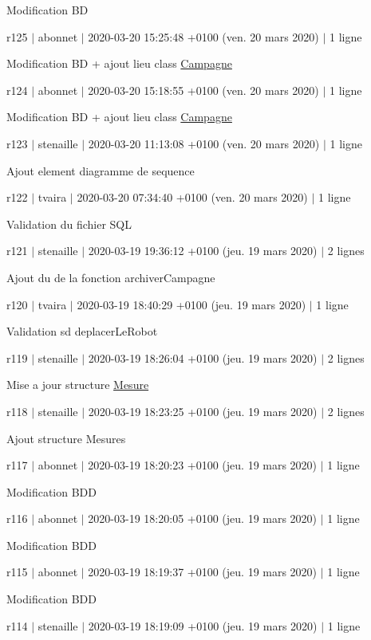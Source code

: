 Modification BD

r125 $\vert$ abonnet $\vert$ 2020-\/03-\/20 15\+:25\+:48 +0100 (ven. 20 mars 2020) $\vert$ 1 ligne

Modification BD + ajout lieu class \hyperlink{class_campagne}{Campagne}

r124 $\vert$ abonnet $\vert$ 2020-\/03-\/20 15\+:18\+:55 +0100 (ven. 20 mars 2020) $\vert$ 1 ligne

Modification BD + ajout lieu class \hyperlink{class_campagne}{Campagne}

r123 $\vert$ stenaille $\vert$ 2020-\/03-\/20 11\+:13\+:08 +0100 (ven. 20 mars 2020) $\vert$ 1 ligne

Ajout element diagramme de sequence

r122 $\vert$ tvaira $\vert$ 2020-\/03-\/20 07\+:34\+:40 +0100 (ven. 20 mars 2020) $\vert$ 1 ligne

Validation du fichier S\+QL

r121 $\vert$ stenaille $\vert$ 2020-\/03-\/19 19\+:36\+:12 +0100 (jeu. 19 mars 2020) $\vert$ 2 lignes

Ajout du de la fonction archiver\+Campagne

r120 $\vert$ tvaira $\vert$ 2020-\/03-\/19 18\+:40\+:29 +0100 (jeu. 19 mars 2020) $\vert$ 1 ligne

Validation sd deplacer\+Le\+Robot

r119 $\vert$ stenaille $\vert$ 2020-\/03-\/19 18\+:26\+:04 +0100 (jeu. 19 mars 2020) $\vert$ 2 lignes

Mise a jour structure \hyperlink{struct_mesure}{Mesure}

r118 $\vert$ stenaille $\vert$ 2020-\/03-\/19 18\+:23\+:25 +0100 (jeu. 19 mars 2020) $\vert$ 2 lignes

Ajout structure Mesures

r117 $\vert$ abonnet $\vert$ 2020-\/03-\/19 18\+:20\+:23 +0100 (jeu. 19 mars 2020) $\vert$ 1 ligne

Modification B\+DD

r116 $\vert$ abonnet $\vert$ 2020-\/03-\/19 18\+:20\+:05 +0100 (jeu. 19 mars 2020) $\vert$ 1 ligne

Modification B\+DD

r115 $\vert$ abonnet $\vert$ 2020-\/03-\/19 18\+:19\+:37 +0100 (jeu. 19 mars 2020) $\vert$ 1 ligne

Modification B\+DD

r114 $\vert$ stenaille $\vert$ 2020-\/03-\/19 18\+:19\+:09 +0100 (jeu. 19 mars 2020) $\vert$ 1 ligne

